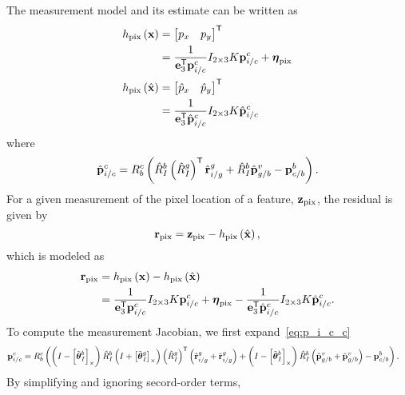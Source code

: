 The measurement model and its estimate can be written as
\begin{align}
  h_{\text{pix}} \left( \boldsymbol{\mathrm{x}} \right)
  &= \begin{bmatrix} p_x & p_y \end{bmatrix}^{\mathsf{T}} \\
  &= \frac{1}{\boldsymbol{\mathrm{e}}_3^{\mathsf{T}} \boldsymbol{\mathrm{p}}_{i/c}^c} I_{2 \times 3} K
  \boldsymbol{\mathrm{p}}_{i/c}^c + \boldsymbol{\mathrm{\eta}}_{\text{pix}} \\
  h_{\text{pix}} \left( \hat{\boldsymbol{\mathrm{x}}} \right)
  &= \begin{bmatrix} \hat{p}_x & \hat{p}_y \end{bmatrix}^{\mathsf{T}} \\
  &= \frac{1}{\boldsymbol{\mathrm{e}}_3^{\mathsf{T}} \hat{\boldsymbol{\mathrm{p}}}_{i/c}^c} I_{2 \times 3} K
  \hat{\boldsymbol{\mathrm{p}}}_{i/c}^c
\end{align}
where
\begin{align}
  \hat{\boldsymbol{\mathrm{p}}}_{i/c}^c = R_b^c \left( \hat{R}_I^b \left( \hat{R}_I^g \right)^{\mathsf{T}}
  \hat{\boldsymbol{\mathrm{r}}}_{i/g}^g + \hat{R}_I^b \hat{\boldsymbol{\mathrm{p}}}_{g/b}^v - \boldsymbol{\mathrm{p}}_{c/b}^b
\right).
\end{align}
For a given measurement of the pixel location of a feature,
$\boldsymbol{\mathrm{z}}_{\text{pix}}$, the residual is given by
\begin{equation}
  \boldsymbol{\mathrm{r}}_{\text{pix}} = \boldsymbol{\mathrm{z}}_{\text{pix}} - h_{\text{pix}} \left( \hat{\boldsymbol{\mathrm{x}}}
    \right),
\end{equation}
which is modeled as
\begin{align}
  \boldsymbol{\mathrm{r}}_{\text{pix}} &= h_{\text{pix}} \left( \boldsymbol{\mathrm{x}} \right) - h_{\text{pix}} \left( \hat{\boldsymbol{\mathrm{x}}}
    \right) \\
  &= \frac{1}{\boldsymbol{\mathrm{e}}_3^{\mathsf{T}} \boldsymbol{\mathrm{p}}_{i/c}^c} I_{2 \times 3} K
  \boldsymbol{\mathrm{p}}_{i/c}^c + \boldsymbol{\mathrm{\eta}}_{\text{pix}} - \frac{1}{\boldsymbol{\mathrm{e}}_3^{\mathsf{T}} \hat{\boldsymbol{\mathrm{p}}}_{i/c}^c} I_{2 \times 3} K
  \hat{\boldsymbol{\mathrm{p}}}_{i/c}^c.
\end{align}
To compute the measurement Jacobian, we first expand~\eqref{eq:p_i_c_c}
\begin{align}
  \boldsymbol{\mathrm{p}}_{i/c}^c &= R_b^c \left( \left( I - \left[ \tilde{\boldsymbol{\mathrm{\theta}}}_I^b
     \right]_{\times} \right) \hat{R}_I^b \left( I + \left[ \tilde{\boldsymbol{\mathrm{\theta}}}_I^g  \right]_{\times}
  \right) \left( \hat{R}_I^g \right)^{\mathsf{T}}
\left( \hat{\boldsymbol{\mathrm{r}}}_{i/g}^g  + \tilde{\boldsymbol{\mathrm{r}}}_{i/g}^g \right) + \left( I - \left[ \tilde{\boldsymbol{\mathrm{\theta}}}_I^b
 \right]_{\times} \right) \hat{R}_I^b \left( \hat{\boldsymbol{\mathrm{p}}}_{g/b}^v + \tilde{\boldsymbol{\mathrm{p}}}_{g/b}^v \right) - \boldsymbol{\mathrm{p}}_{c/b}^b \right).
\end{align}
By simplifying and ignoring secord-order terms,
